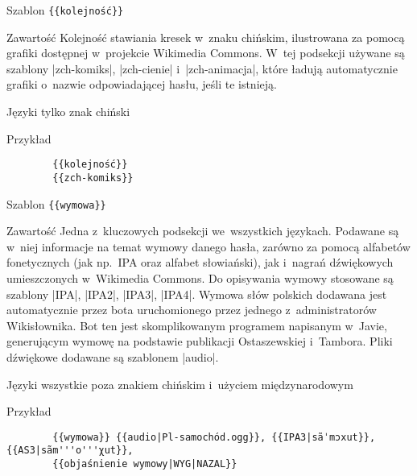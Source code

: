\documentclass{pracamgr}
\begin{document}
\spacer
\begin{opis}
	\item[Szablon] \verb|{{kolejność}}|
	\item[Zawartość] Kolejność stawiania kresek w~znaku chińskim, ilustrowana za pomocą grafiki dostępnej w~projekcie Wikimedia Commons. W~tej podsekcji używane są szablony \kod|{{zch-komiks}}|, \kod|{{zch-cienie}}| i~\kod|{{zch-animacja}}|, które ładują automatycznie grafiki o~nazwie odpowiadającej hasłu, jeśli te istnieją.
	\item[Języki] tylko znak chiński
	\item[Przykład]
		\begin{verbatim}
		{{kolejność}}
		{{zch-komiks}}
		\end{verbatim}
\end{opis}
\spacer
\begin{opis}
	\item[Szablon] \verb|{{wymowa}}|
	\item[Zawartość] Jedna z~kluczowych podsekcji we~wszystkich językach. Podawane są w~niej informacje na temat wymowy danego hasła, zarówno za pomocą alfabetów fonetycznych (jak np.\ IPA oraz alfabet słowiański), jak i~nagrań dźwiękowych umieszczonych w~Wikimedia Commons. Do opisywania wymowy stosowane są szablony \kod|{{IPA}}|, \kod|{{IPA2}}|, \kod|{{IPA3}}|, \kod|{{IPA4}}|. Wymowa słów polskich dodawana jest automatycznie przez bota uruchomionego przez jednego z~administratorów Wikisłownika. Bot ten jest skomplikowanym programem napisanym w~Javie, generującym wymowę na podstawie publikacji Ostaszewskiej i~Tambora. %
	Pliki dźwiękowe dodawane są szablonem \kod|{{audio}}|.
	\item[Języki] wszystkie poza znakiem chińskim i~użyciem międzynarodowym
	\item[Przykład]
		\begin{verbatim}
		{{wymowa}} {{audio|Pl-samochód.ogg}}, {{IPA3|sãˈmɔxut}}, {{AS3|sãm'''o'''χut}},
		{{objaśnienie wymowy|WYG|NAZAL}}
		\end{verbatim}
\end{opis}
\spacer
\end{document}
